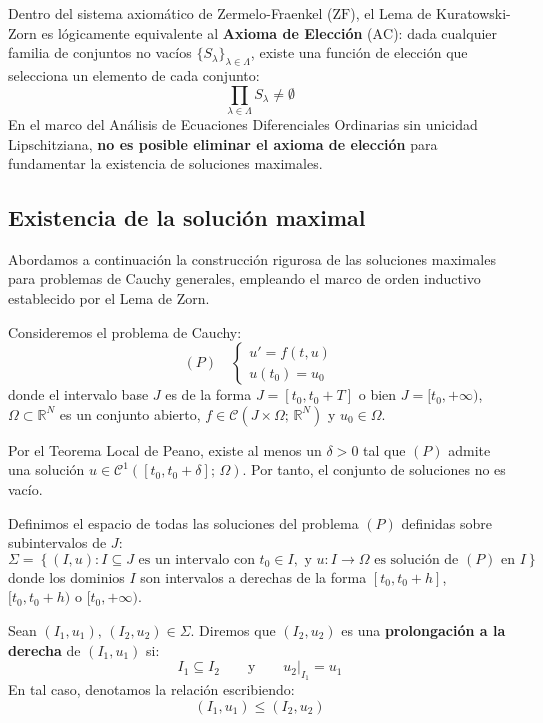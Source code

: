 \begin{observación}
    Dentro del sistema axiomático de Zermelo-Fraenkel ($\text{ZF}$), el Lema de Kuratowski-Zorn es lógicamente equivalente al \textbf{Axioma de Elección} ($\text{AC}$): dada cualquier familia de conjuntos no vacíos $\{S_\lambda\}_{\lambda \in \Lambda}$, existe una función de elección que selecciona un elemento de cada conjunto:
    \[
        \prod_{\lambda \in \Lambda} S_\lambda \neq \emptyset
    \]
    En el marco del Análisis de Ecuaciones Diferenciales Ordinarias sin unicidad Lipschitziana, \textbf{no es posible eliminar el axioma de elección} para fundamentar la existencia de soluciones maximales.
\end{observación}

\subsection{Existencia de la solución maximal}

Abordamos a continuación la construcción rigurosa de las soluciones maximales para problemas de Cauchy generales, empleando el marco de orden inductivo establecido por el Lema de Zorn.

Consideremos el problema de Cauchy:
\[
    (P) \quad
    \begin{cases}
        u' = f(t, u) \\
        u(t_0) = u_0
    \end{cases}
\]
donde el intervalo base $J$ es de la forma $J = [t_0, t_0 + T]$ o bien $J = [t_0, +\infty)$, $\Omega \subset \mathbb{R}^N$ es un conjunto abierto, $f \in \mathcal{C}(J \times \Omega; \, \mathbb{R}^N)$ y $u_0 \in \Omega$.

Por el Teorema Local de Peano, existe al menos un $\delta > 0$ tal que $(P)$ admite una solución $u \in \mathcal{C}^1([t_0, t_0 + \delta]; \, \Omega)$. Por tanto, el conjunto de soluciones no es vacío.

Definimos el espacio de todas las soluciones del problema $(P)$ definidas sobre subintervalos de $J$:
\[
    \Sigma = \left\{ (I, u) : I \subseteq J \text{ es un intervalo con } t_0 \in I, \text{ y } u: I \to \Omega \text{ es solución de } (P) \text{ en } I \right\}
\]
donde los dominios $I$ son intervalos a derechas de la forma $[t_0, t_0 + h]$, $[t_0, t_0 + h)$ o $[t_0, +\infty)$.

\begin{definición}
    Sean $(I_1, u_1), \, (I_2, u_2) \in \Sigma$. Diremos que $(I_2, u_2)$ es una \textbf{prolongación a la derecha} de $(I_1, u_1)$ si:
    \[
        I_1 \subseteq I_2 \qquad \text{y} \qquad u_2\big|_{I_1} = u_1
    \]
    En tal caso, denotamos la relación escribiendo:
    \[
        (I_1, u_1) \leq (I_2, u_2)
    \]
\end{definición}

